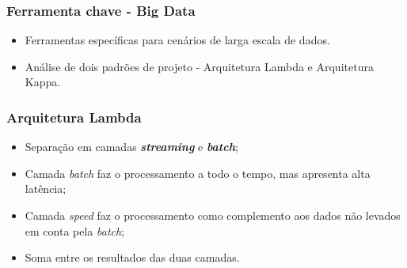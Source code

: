 \begin{frame}
    \frametitle{Ferramenta chave - Big Data}
    \begin{itemize}
        \item Ferramentas específicas para cenários de larga escala de dados.
        \item Análise de dois padrões de projeto - Arquitetura Lambda e Arquitetura Kappa.
    \end{itemize}
\end{frame}

\begin{frame}
    \frametitle{Arquitetura Lambda}
    \begin{itemize}
        \item Separação em camadas \textbf{\textit{streaming}} e
            \textbf{\textit{batch}};
        \item Camada \textit{batch} faz o processamento a todo o tempo, mas
            apresenta alta latência;
        \item Camada \textit{speed} faz o processamento como complemento aos
            dados não levados em conta pela \textit{batch};
        \item Soma entre os resultados das duas camadas.
    \end{itemize}
\end{frame}
